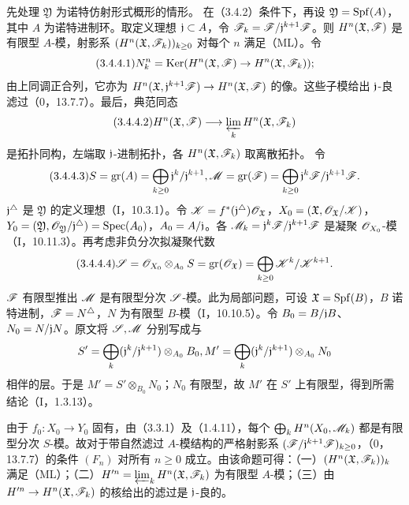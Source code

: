 先处理 $\mathfrak Y$ 为诺特仿射形式概形的情形。
在（3.4.2）条件下，再设 $\mathfrak Y=\operatorname{Spf}(A)$，其中 $A$ 为诺特进制环。取定义理想 $\mathfrak j\subset A$，令 $\mathscr F_k=\mathscr F/\mathfrak j^{k+1}\mathscr F$。则 $H^n(\mathfrak X,\mathscr F)$ 是有限型 $A$-模，射影系 $(H^n(\mathfrak X,\mathscr F_k))_{k\ge0}$ 对每个 $n$ 满足（ML）。令
\begin{equation}\tag{3.4.4.1}
N_k^n=\Ker(H^n(\mathfrak X,\F)\to H^n(\mathfrak X,\F_k));
\end{equation}
由上同调正合列，它亦为 $H^n(\mathfrak X,\mathfrak j^{k+1}\mathscr F)\to H^n(\mathfrak X,\mathscr F)$ 的像。这些子模给出 $\mathfrak j$-良滤过（0，13.7.7）。最后，典范同态
\begin{equation}\tag{3.4.4.2}
H^n(\mathfrak X,\F)\longrightarrow\plim_kH^n(\mathfrak X,\F_k)
\end{equation}
是拓扑同构，左端取 $\mathfrak j$-进制拓扑，各 $H^n(\mathfrak X,\mathscr F_k)$ 取离散拓扑。
\eproof
令
\begin{equation}\tag{3.4.4.3}
S=\gr(A)=\bigoplus_{k\ge0}\frj^k/\frj^{k+1},\qquad
\M=\gr(\F)=\bigoplus_{k\ge0}\frj^k\F/\frj^{k+1}\F.
\end{equation}
$\mathfrak j^\triangle$ 是 $\mathfrak Y$ 的定义理想（I，10.3.1）。令 $\mathscr K=f^*(\mathfrak j^\triangle)\mathscr O_{\mathfrak X}$，$X_0=(\mathfrak X,\mathscr O_{\mathfrak X}/\mathscr K)$，$Y_0=(\mathfrak Y,\mathscr O_{\mathfrak Y}/\mathfrak j^\triangle)=\operatorname{Spec}(A_0)$，$A_0=A/\mathfrak j$。各 $\mathscr M_k=\mathfrak j^k\mathscr F/\mathfrak j^{k+1}\mathscr F$ 是凝聚 $\mathscr O_{X_0}$-模（I，10.11.3）。再考虑非负分次拟凝聚代数
\begin{equation}\tag{3.4.4.4}
\SSS=\OO_{X_0}\otimes_{A_0}S
=\gr(\OO_{\mathfrak X})=\bigoplus_{k\ge0}\K^k/\K^{k+1}.
\end{equation}
$\mathscr F$ 有限型推出 $\mathscr M$ 是有限型分次 $\mathscr S$-模。此为局部问题，可设 $\mathfrak X=\operatorname{Spf}(B)$，$B$ 诺特进制，$\mathscr F=N^\triangle$，$N$ 为有限型 $B$-模（I，10.10.5）。令 $B_0=B/\mathfrak j B$、$N_0=N/\mathfrak j N$。原文将 $\mathscr S,\mathscr M$ 分别写成与
\[
S'=\bigoplus_k(\mathfrak j^k/\mathfrak j^{k+1})\otimes_{A_0}B_0,
 M'=\bigoplus_k(\mathfrak j^k/\mathfrak j^{k+1})\otimes_{A_0}N_0
\]
相伴的层。于是 $M'=S'\otimes_{B_0}N_0$；$N_0$ 有限型，故 $M'$ 在 $S'$ 上有限型，得到所需结论（I，1.3.13）。

由于 $f_0:X_0\to Y_0$ 固有，由（3.3.1）及（1.4.11），每个 $\bigoplus_kH^n(X_0,\mathscr M_k)$ 都是有限型分次 $S$-模。故对于带自然滤过 $A$-模结构的严格射影系 $(\mathscr F/\mathfrak j^{k+1}\mathscr F)_{k\ge0}$，（0，13.7.7）的条件 $(F_n)$ 对所有 $n\ge0$ 成立。由该命题可得：（一）$(H^n(\mathfrak X,\mathscr F_k))_k$ 满足（ML）；（二）$H'^n=\varprojlim_kH^n(\mathfrak X,\mathscr F_k)$ 为有限型 $A$-模；（三）由 $H'^n\to H^n(\mathfrak X,\mathscr F_k)$ 的核给出的滤过是 $\mathfrak j$-良的。

